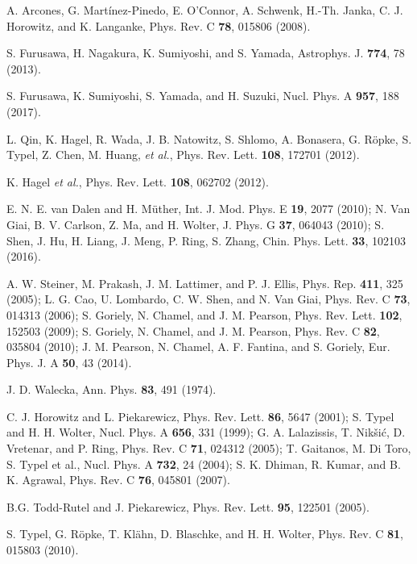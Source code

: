 \documentclass[aps,prc,nofootinbib,twocolumn,showpacs]{revtex4-1}
\begin{document}
\begin{thebibliography}{99}

 A. Arcones, G. Martínez-Pinedo, E. O'Connor,
  A. Schwenk, H.-Th. Janka, C. J. Horowitz, and K. Langanke,
  Phys. Rev. C {\bf 78}, 015806 (2008).

 S. Furusawa, H. Nagakura, K. Sumiyoshi, and S. Yamada,
  Astrophys. J. {\bf 774}, 78 (2013).
  
 S. Furusawa, K. Sumiyoshi, S. Yamada, and H. Suzuki,
  Nucl. Phys. A {\bf 957}, 188 (2017).  

 L. Qin, K. Hagel, R. Wada, J. B. Natowitz, S. Shlomo, A. Bonasera, G. R\"opke, S. Typel, Z. Chen, M. Huang, \textit{et al.}, Phys. Rev. Lett. {\bf 108}, 172701 (2012).

 K. Hagel \textit{et al.}, Phys. Rev. Lett. {\bf 108}, 062702 (2012). 

 E. N. E. van Dalen and H. M\"uther, Int. J. Mod. Phys. E {\bf 19}, 2077 (2010); 
N. Van Giai, B. V. Carlson, Z. Ma, and H. Wolter, J. Phys. G {\bf 37}, 064043 (2010); 
S. Shen, J. Hu, H. Liang, J. Meng, P. Ring, S. Zhang,
Chin. Phys. Lett. {\bf 33}, 102103 (2016).

 A. W. Steiner, M. Prakash, J. M. Lattimer, and P. J. Ellis, Phys. Rep. {\bf 411}, 325 (2005); L. G. Cao, U. Lombardo, C. W. Shen, and N. Van Giai, Phys. Rev. C {\bf 73}, 014313 (2006); 
S. Goriely, N. Chamel, and J. M. Pearson, Phys. Rev. Lett. {\bf 102}, 152503 (2009); S. Goriely, N. Chamel, and J. M. Pearson, Phys. Rev. C {\bf 82}, 035804 (2010); J. M. Pearson, N. Chamel, A. F. Fantina, and S. Goriely, Eur. Phys. J. A {\bf 50}, 43 (2014).

 J. D. Walecka, Ann. Phys. {\bf 83}, 491 (1974).

 C. J. Horowitz and L. Piekarewicz, Phys. Rev. Lett. {\bf
    86}, 5647 (2001); S. Typel and H. H. Wolter, Nucl. Phys. A {\bf 656}, 331 (1999); 
G. A. Lalazissis, T. Nikšić, D. Vretenar, and P. Ring, Phys. Rev. C
{\bf 71}, 024312 (2005); T. Gaitanos, M. Di Toro, S. Typel et al.,
Nucl. Phys. A {\bf 732}, 24 (2004); S. K. Dhiman, R. Kumar, and
B. K. Agrawal, Phys. Rev. C {\bf 76}, 045801 (2007).

 B.G. Todd-Rutel and J. Piekarewicz,  Phys. Rev. Lett. {\bf 95}, 122501 (2005).

 S. Typel, G. R\"opke, T. Kl\"ahn, D. Blaschke, and H. H. Wolter, Phys. Rev. C {\bf 81}, 015803 (2010).


\end{thebibliography}
\end{document}
